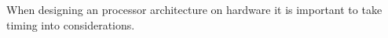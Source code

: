 When designing an processor architecture on hardware it is important to take timing into considerations. 